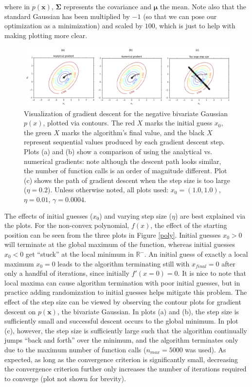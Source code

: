 \documentclass[10pt]{article}
\begin{document}
where in $p(\mathbf{x})$, $\mathbf{\Sigma}$ represents the covariance and $\boldsymbol{\mu}$ the mean.  Note also that the standard Gaussian has been multiplied by $-1$ (so that we can pose our optimization as a minimization) and scaled by $100$, which is just to help with making plotting more clear.

\begin{figure}[!ht]
\centering
\includegraphics[scale=0.9]{negGaussianDescent.pdf}
\caption{Visualization of gradient descent for the negative bivariate Gaussian $p(x)$, plotted via contours.  The red $X$ marks the initial guess $x_0$, the green $X$ marks the algorithm's final value, and the black $X$ represent sequential values produced by each gradient descent step.  Plots (a) and (b) show a comparison of using the analytical vs. numerical gradients: note although the descent path looks similar, the number of function calls is an order of magnitude different.   Plot (c) shows the path of gradient descent when the step size is too large ($\eta = 0.2$). Unless otherwise noted, all plots used: $x_0 = (1.0,1.0)$, $\eta = 0.01$, $\gamma = 0.0004$.}
\label{gauss}
\end{figure}

The effects of initial guesses ($x_0$) and varying step size ($\eta$) are best explained via the plots.  For the non-convex polynomial, $f(x)$, the effect of the starting position can be seen from the three plots in Figure \ref{poly}.  Initial guesses $x_0 > 0$ will terminate at the global maximum of the function, whereas initial guesses $x_0 < 0$ get ``stuck'' at the local minimum in $\mathbb{R}^-$.  An initial guess of exactly a local maximum $x_0 = 0$ leads to the algorithm terminating still with $x_{final} = 0$ after only a handful of iterations, since initially $f'(x=0)=0$.  It is nice to note that local maxima can cause algorithm termination with poor initial guesses, but in practice adding randomization to initial guesses helps mitigate this problem.  The effect of the step size can be viewed by observing the contour plots for gradient descent on $p(\mathbf{x})$, the bivariate Gaussian.  In plots (a) and (b), the step size is sufficiently small and successful descent occurs to the global minimum.  In plot (c), however, the step size is sufficiently large such that the algorithm continually jumps ``back and forth'' over the minimum, and the algorithm terminates only due to the maximum number of function calls ($n_{max}=5000$ was used).  As expected, as long as the convergence criterion is significantly small, decreasing the convergence criterion further only increases the number of iterations required to converge (plot not shown for brevity).
\end{document}
